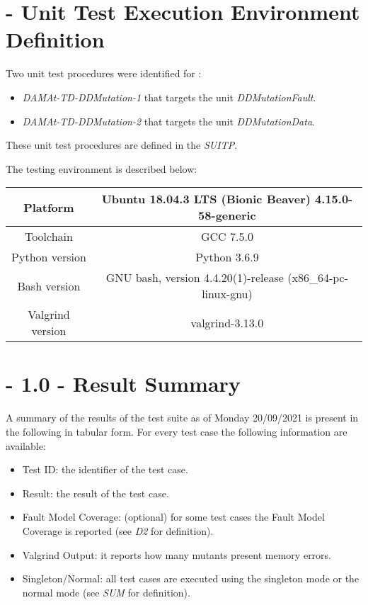 
\chapter{\DAMA{} - Unit Test Execution Environment Definition}

Two unit test procedures were identified for \DAMA:
\begin{itemize}
  \item {\emph{DAMAt-TD-DDMutation-1}} that targets the unit \emph{DDMutationFault}.
  \item {\emph{DAMAt-TD-DDMutation-2}} that targets the unit \emph{DDMutationData}.
\end{itemize}

These unit test procedures are defined in the \emph{SUITP}.

The testing environment is described below:

\begin{center}
\begin{tabular}{ |c|c| }
 \hline
 Platform & Ubuntu 18.04.3 LTS (Bionic Beaver) 4.15.0-58-generic \\
 \hline
 Toolchain & GCC 7.5.0 \\
 \hline
 Python version & Python 3.6.9 \\
 \hline
 Bash version & GNU bash, version 4.4.20(1)-release (x86\_64-pc-linux-gnu) \\
 \hline
 Valgrind version & valgrind-3.13.0 \\
 \hline
\end{tabular}
\end{center}


\chapter{\DAMA{} - 1.0 - Result Summary}


A summary of the results of the test suite as of Monday 20/09/2021 is present in the following in tabular form.
For every test case the following information are available:
\begin{itemize}
  \item{Test ID}: the identifier of the test case.
  \item{Result}: the result of the test case.
  \item{Fault Model Coverage}: (optional) for some test cases the Fault Model Coverage is reported (see \emph{D2} for definition).
  \item{Valgrind Output}: it reports how many mutants present memory errors.
  \item{Singleton/Normal}: all test cases are executed using the singleton mode or the normal mode (see \emph{SUM} for definition).
\end{itemize}

